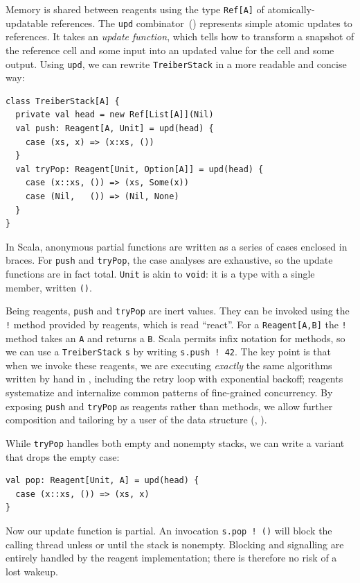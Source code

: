 \documentclass[preprint,nocopyrightspace]{sigplanconf}
\begin{document}
Memory is shared between reagents using the type \lstinline{Ref[A]} of
atomically-updatable references.
The \lstinline{upd} combinator~() represents simple atomic
updates to references.  It takes an \emph{update function}, which tells how to
transform a snapshot of the reference cell and some input into an updated
value for the cell and some output.  Using \lstinline{upd}, we can rewrite
\lstinline{TreiberStack} in a more readable and concise way:
\begin{lstlisting}
class TreiberStack[A] {
  private val head = new Ref[List[A]](Nil)
  val push: Reagent[A, Unit] = upd(head) {
    case (xs, x) => (x:xs, ())
  }
  val tryPop: Reagent[Unit, Option[A]] = upd(head) {
    case (x::xs, ()) => (xs, Some(x))
    case (Nil,   ()) => (Nil, None)
  }
}
\end{lstlisting}
In Scala, anonymous partial functions are written as a series of cases
enclosed in braces.  For \lstinline{push} and \lstinline{tryPop}, the case
analyses are exhaustive, so the update functions are in fact total.
\lstinline{Unit} is akin to \lstinline{void}: it is a type with a single
member, written \lstinline{()}.

Being reagents, \lstinline{push} and \lstinline{tryPop} are inert values.  They
can be invoked using the \lstinline{!} method provided by reagents, which is
read ``react''.  For a \lstinline{Reagent[A,B]} the \lstinline{!} method takes
an \lstinline{A} and returns a \lstinline{B}.  Scala permits infix notation for
methods, so we can use a \lstinline{TreiberStack} \lstinline{s} by writing
\lstinline{s.push ! 42}.  The key point is that when we invoke these reagents,
we are executing \emph{exactly} the same algorithms written by hand in
, including the retry loop with exponential backoff; reagents
systematize and internalize common patterns of fine-grained concurrency.  By
exposing \lstinline{push} and \lstinline{tryPop} as reagents rather than
methods, we allow further composition and tailoring by a user of the data
structure (, ).

While \lstinline{tryPop} handles both empty and nonempty stacks, we
can write a variant that drops the empty case:
\begin{lstlisting}
val pop: Reagent[Unit, A] = upd(head) {
  case (x::xs, ()) => (xs, x)
}
\end{lstlisting}
Now our update function is partial.  An invocation \lstinline{s.pop ! ()} will
block the calling thread unless or until the stack is nonempty.  Blocking and
signalling are entirely handled by the reagent implementation; there is
therefore no risk of a lost wakeup.  %
\end{document}
